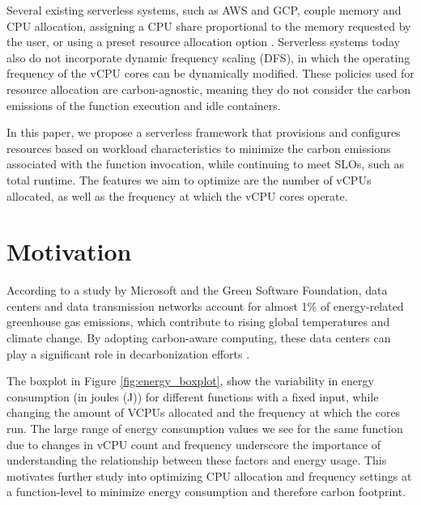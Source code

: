 \documentclass[times, 10pt,twocolumn]{article}
\begin{document}
Several existing serverless systems, such as AWS and GCP, couple memory and CPU allocation, assigning a CPU share proportional to the memory requested by the user, or using a preset resource allocation option \cite{bibal2023acm}. Serverless systems today also do not incorporate dynamic frequency scaling (DFS), in which the operating frequency of the vCPU cores can be dynamically modified. These policies used for resource allocation are carbon-agnostic, meaning they do not consider the carbon emissions of the function execution and idle containers.

In this paper, we propose a serverless framework that provisions and configures resources based on workload characteristics to minimize the carbon emissions associated with the function invocation, while continuing to meet SLOs, such as total runtime. The features we aim to optimize are the number of vCPUs allocated, as well as the frequency at which the vCPU cores operate. 

\section{Motivation}

According to a study by Microsoft and the Green Software Foundation, data centers and data transmission networks account for almost 1\% of energy-related greenhouse gas emissions, which contribute to rising global temperatures and climate change. By adopting carbon-aware computing, these data centers can play a significant role in decarbonization efforts \cite{carbon_aware_computing}. 



The boxplot in Figure \ref{fig:energy_boxplot}, 
show the variability in energy consumption (in joules (J)) for different functions with a fixed input, while changing the amount of VCPUs allocated and the frequency at which the cores run.
The large range of energy consumption values we see for the same function due to changes in vCPU count and frequency underscore the importance of understanding the relationship between these factors and energy usage. This motivates further study into optimizing CPU allocation and frequency settings at a function-level to minimize energy consumption and therefore carbon footprint. 
\end{document}

